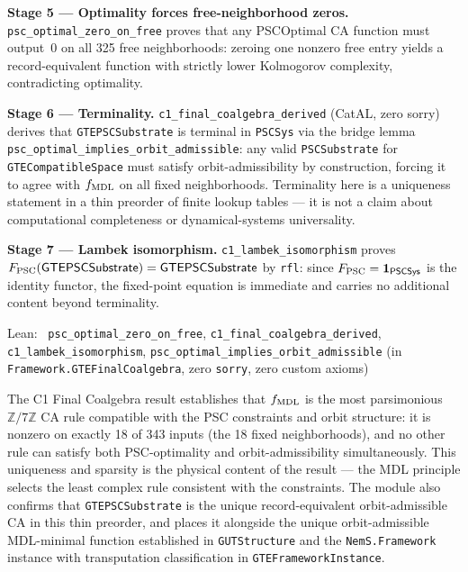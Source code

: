 \documentclass[11pt,a4paper]{article}
\newenvironment{leanref}%
  {\par\smallskip\noindent\begingroup\raggedright\textup{Lean:}~}%
  {\par\endgroup}
\theoremstyle{definition}
\begin{document}
\textbf{Stage 5 — Optimality forces free-neighborhood zeros.}
\lstinline|psc_optimal_zero_on_free| proves that any PSCOptimal CA function must output~0
on all 325 free neighborhoods: zeroing one nonzero free entry yields a record-equivalent
function with strictly lower Kolmogorov complexity, contradicting optimality.

\textbf{Stage 6 — Terminality.}  \lstinline|c1_final_coalgebra_derived| (CatAL, zero sorry)
derives that \lstinline|GTEPSCSubstrate| is terminal in \texttt{PSCSys} via the bridge lemma
\lstinline|psc_optimal_implies_orbit_admissible|: any valid \texttt{PSCSubstrate} for
\texttt{GTECompatibleSpace} must satisfy orbit-admissibility by construction, forcing it
to agree with $f_{\rm MDL}$ on all fixed neighborhoods.  Terminality here is a
uniqueness statement in a thin preorder of finite lookup tables — it is not a claim
about computational completeness or dynamical-systems universality.

\textbf{Stage 7 — Lambek isomorphism.}  \lstinline|c1_lambek_isomorphism| proves
$F_{\rm PSC}(\mathsf{GTEPSCSubstrate}) = \mathsf{GTEPSCSubstrate}$ by \lstinline|rfl|:
since $F_{\rm PSC} = \mathbf{1}_{\mathsf{PSCSys}}$ is the identity functor, the
fixed-point equation is immediate and carries no additional content beyond terminality.

\begin{leanref}
\lstinline|psc_optimal_zero_on_free|, \lstinline|c1_final_coalgebra_derived|,
\lstinline|c1_lambek_isomorphism|, \lstinline|psc_optimal_implies_orbit_admissible|
\textup{(in \texttt{Framework.GTEFinalCoalgebra}, zero \texttt{sorry}, zero custom axioms)}
\end{leanref}

The C1 Final Coalgebra result establishes that $f_{\rm MDL}$ is the most parsimonious
$\mathbb{Z}/7\mathbb{Z}$ CA rule compatible with the PSC constraints and orbit structure:
it is nonzero on exactly 18 of 343 inputs (the 18 fixed neighborhoods), and no other
rule can satisfy both PSC-optimality and orbit-admissibility simultaneously.  This
uniqueness and sparsity is the physical content of the result — the MDL principle
selects the least complex rule consistent with the constraints.  The module also
confirms that \lstinline|GTEPSCSubstrate| is the unique record-equivalent orbit-admissible
CA in this thin preorder, and places it alongside the unique orbit-admissible MDL-minimal
function established in \texttt{GUTStructure} and the \texttt{NemS.Framework} instance
with transputation classification in \texttt{GTEFrameworkInstance}.
\end{document}
